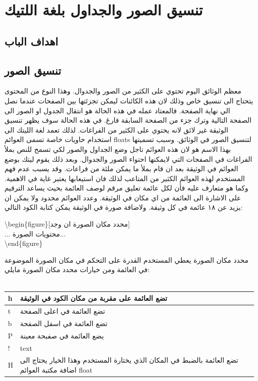 \chapter{تنسيق الصور والجداول بلغة اللتيك}

\section{اهداف الباب}

\section{تنسيق الصور}
معظم الوثائق اليوم تحتوي على الكثير من الصور والجدوال. وهذا النوع من المحتوى يتحتاج الى تنسيق خاص وذلك لان هذه الكائنات ليمكن تجزئتها بين الصفحات عندما نصل الي نهاية الصفحة. فالمعتاد عمله في هذه الحالة هو انتقال الجدول او الصور الى الصفحة التالية وترك جزء من الصفحة السابقة فارغ. في هذه الحالة سوف يظهر تنسيق الوثيقة غير لائق لانه يحتوي على الكثير من الفراغات. لذلك تعمد لغة الليتك الى استخدام حاويات خاصة 
تسمى العوائم floats لتنسيق الصور في الوثائق. وسبب تسميتها بهذا الاسم هو لان هذه العوائم تاجل وضع الجداول والصور لكي تسمح للنص بملأ الفراغات في الصفحات التي لايمكنها احتواء الصور والجدوال. وبعد ذلك يقوم ليتك بوضع العوائم في الوثيقة بعد  ان قام بملأ ما يمكن ملئة من فراعات. وقد يسبب عدم فهم المستخدم لهذه العوائم الكثير من المتاعب لذلك فان استيعابها يعتبر غاية في الاهمية. وكما هو متعارف عليه فأن لكل عائمة تعليق مرقم لوصف العائمة بحيث يساعد الترقيم على الاشارة الى العائمة من اي مكان في الوثيقة. وعدد العوائم محدود ولا يمكن ان يزيد عن ١٨ عائمة في كل وثيقة. ولاضافة صورة في الوثيقة يمكن كتابة الكود التالي:
\begin{english}
\begin{mybox}
\textbackslash begin\{figure\}[\textarabic{محدد مكان الصورة ان وجد}]\\
... \textarabic{محتويات الصورة}...\\
\textbackslash end\{figure\}\\
\end{mybox}
\end{english}
محدد مكان الصورة يعطي المستخدم القدرة على التحكم في مكان الصورة الموضوعة في العائمة ومن خيارات محدد مكان الصورة مايلي:\\
\\
\begin{tabular}{|l | p{11cm}|}
\hline
h & تضع العائمة على مقربة من مكان الكود في الوثيقة\\ \hline
t & تضع العائمة في اعلى الصفحة\\ \hline
b & تضع العائمة في اسفل الصفحة\\ \hline
P & يضع العائمة في صفبحة معينة  \\ \hline
! & text \\ \hline
H & تضع العائمة بالضبط في المكان الذي يختارة المستخدم وهذا الخيار يحتاج الى اضافة مكتبة العوائم
float  \\ \hline
\end{tabular}
